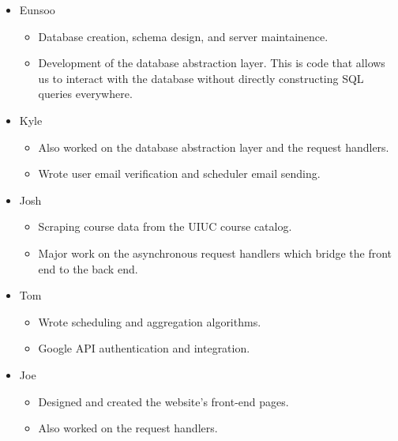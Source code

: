 \documentclass{article}
\begin{document}
            \begin{itemize}\itemsep0em
                \item Eunsoo
                    \begin{itemize}\itemsep0em
                    \item Database creation, schema design, and server
                        maintainence.
                    \item Development of the database abstraction layer. This
                        is code that allows us to interact with the database
                        without directly constructing SQL queries everywhere.
                    \end{itemize}

                \item Kyle
                    \begin{itemize}\itemsep0em
                    \item Also worked on the database abstraction layer and the
                        request handlers.
                    \item Wrote user email verification and scheduler email
                        sending.
                    \end{itemize}

                \item Josh
                    \begin{itemize}\itemsep0em
                    \item Scraping course data from the UIUC course catalog.
                    \item Major work on the asynchronous request handlers which
                        bridge the front end to the back end.
                    \end{itemize}

                \item Tom
                    \begin{itemize}\itemsep0em
                    \item Wrote scheduling and aggregation algorithms.
                    \item Google API authentication and integration.
                    \end{itemize}
 
                \item Joe
                    \begin{itemize}\itemsep0em
                    \item Designed and created the website's front-end pages.
                    \item Also worked on the request handlers.
                    \end{itemize}

           \end{itemize}
\end{document}
